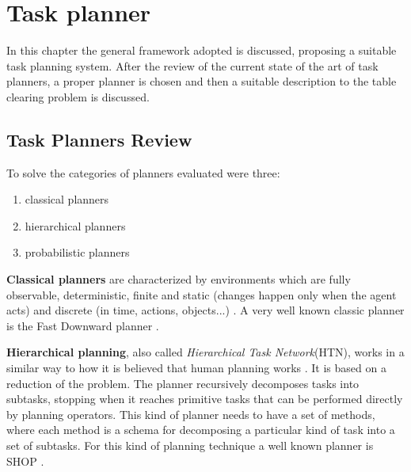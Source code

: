 \chapter{Task planner}
\label{ch:task_planner}
In this chapter the general framework adopted is discussed, proposing a suitable task planning system. After the  review of the current state of the art of task planners, a proper planner is chosen and then a suitable description to the table clearing problem is discussed.
\section{Task Planners Review}
To solve the categories of planners evaluated were three:
\begin{enumerate}
\item classical planners
\item hierarchical planners
\item probabilistic planners
\end{enumerate}
\textbf{Classical planners} are characterized by environments which are fully observable, deterministic, finite and static (changes happen only when the agent acts) and discrete (in time, actions, objects...) \citep{artificialIntelligence}.  A very well known classic planner is the Fast Downward planner \cite{helmert2006fast}.


\textbf{Hierarchical planning}, also called \textit{Hierarchical Task Network}(HTN), works in a similar way to how it is believed that human planning 
works \citep{marthi2007angelic}. It is based on a reduction of the problem. The planner recursively decomposes tasks into subtasks, stopping when it reaches primitive tasks that can be performed directly by planning operators. This kind of planner needs to have a set of methods, where each method is a schema for decomposing a particular kind of task into a set of subtasks. For this kind of planning technique a well known planner is SHOP \citep{shop}.

